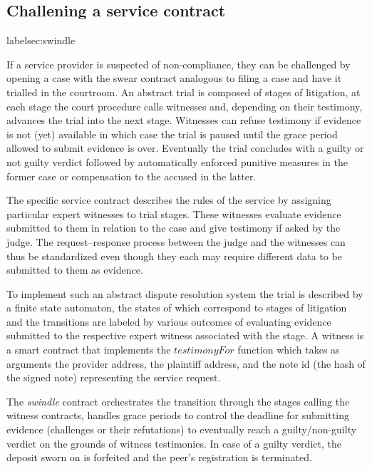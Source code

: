 \documentclass[a4paper,10pt]{article}
\newcommand\gloss[1]{\emph{\gls{#1}}}
\begin{document}
\subsection{Challening a service contract}
label{sec:swindle}

If a service provider is suspected of non-compliance, they can be challenged
by opening a case with the swear contract analogous to filing a case and have it 
trialled in the courtroom.
An abstract trial is composed of stages of litigation, at each stage
the court procedure calls witnesses and, depending on their testimony,
advances the trial into the next stage. Witnesses can refuse testimony
if evidence is not (yet) available in which case the trial
is paused until the grace period allowed to submit evidence is over.
Eventually the trial concludes with a guilty or not guilty verdict followed
by automatically enforced punitive measures in the former case or
compensation to the accused in the latter.

The specific service contract describes the rules of the service
by assigning particular expert witnesses to trial stages. These witnesses
evaluate evidence submitted to them in relation to the case
and give testimony if asked by the judge.
The request--response process between the judge and the witnesses can
thus be standardized
even though they each may require different data to be submitted to them as evidence.

To implement such an abstract dispute resolution system
the trial is described by a finite state automaton, the states of which correspond
to stages of litigation and
the transitions are labeled by various outcomes of evaluating evidence submitted
to the respective expert witness associated with the stage. A witness
is a smart contract that implements the $\mathit{testimonyFor}$ function which takes
as arguments the provider address, the plaintiff address, and the note id (the hash of the signed note)
representing the service request.

The \gloss{swindle} contract orchestrates the transition through the stages calling the witness contracts,
handles grace periods to control the deadline for submitting evidence (challenges or their refutations) to
eventually reach a guilty/non-guilty verdict on the grounds of witness testimonies.
In case of a guilty verdict, the deposit sworn on is forfeited and the peer's registration is
terminated. 
\end{document}
